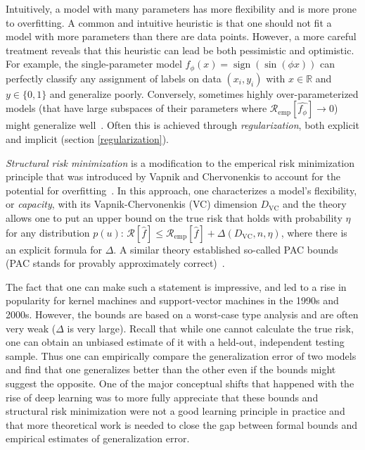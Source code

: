 Intuitively, a model with many parameters has more flexibility and is more prone to overfitting. A common and intuitive heuristic is that one should not fit a model with more parameters than there are data points. However, a more careful treatment reveals that this heuristic can lead be both pessimistic and optimistic. For example, the single-parameter model $f_\phi(x) = \operatorname{sign}(\sin(\phi x))$ can perfectly classify any assignment of labels on data $(x_i, y_i)$ with $x \in \mathbb{R}$ and $y\in \{0,1\}$ and generalize poorly. Conversely, sometimes highly over-parameterized models (that have large subspaces of their parameters where $\mathcal{R}_\textrm{emp}[\hat{f_\phi}] \to 0$) might generalize well~\cite{zhang2021understanding-2, nakkiran2019deep}. Often this is 
achieved through \textit{regularization}, both 
explicit and implicit (section \ref{regularization}). 


\textit{Structural risk minimization} is a modification to the emperical risk minimization principle that was introduced by Vapnik and Chervonenkis to account for the potential for overfitting~\cite{vapnik2013nature}.  In this approach, one characterizes a model's flexibility, or \textit{capacity}, with its Vapnik-Chervonenkis (VC) dimension $D_\textrm{VC}$ and the theory allows one to put an upper bound on the true risk that holds with probability $\eta$ for any distribution $p(u)$: $\mathcal{R}[\hat{f}] \le \mathcal{R}_\textrm{emp}[\hat{f}] + \Delta(D_\textrm{VC}, n, \eta)$, where there is an explicit formula for $\Delta$. A similar theory established so-called PAC bounds (PAC stands for provably approximately correct)~\cite{valiant1984theory}. 

The fact that one can make such a statement is impressive, and led to a rise in popularity for kernel machines and support-vector machines in the 1990s and 2000s. However, the bounds are based on a worst-case type analysis and are often very weak (\ie $\Delta$ is very large). Recall that while one cannot calculate the true risk, one can obtain an unbiased estimate of it with a held-out, independent testing sample. Thus one can empirically compare the generalization error of two models and find that one generalizes better than the other even if the bounds might suggest the opposite. One of the major conceptual shifts that happened with the rise of deep learning was to more fully appreciate that these bounds and structural risk minimization were not a good learning principle in practice and that more theoretical work is needed to close the gap between formal bounds and empirical estimates of generalization error. 

